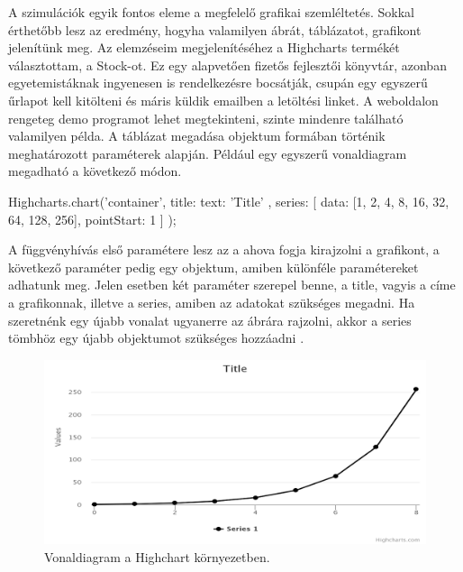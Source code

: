 A szimulációk egyik fontos eleme a megfelelő grafikai szemléltetés. Sokkal érthetőbb lesz az eredmény, hogyha valamilyen ábrát, táblázatot, grafikont jelenítünk meg. Az elemzéseim megjelenítéséhez a Highcharts termékét választottam, a Stock-ot. Ez egy alapvetően fizetős fejlesztői könyvtár, azonban egyetemistáknak ingyenesen is rendelkezésre bocsátják, csupán egy egyszerű űrlapot kell kitölteni és máris küldik emailben a letöltési linket. A weboldalon rengeteg demo programot lehet megtekinteni, szinte mindenre található valamilyen példa. A táblázat megadása objektum formában történik meghatározott paraméterek alapján. Például egy egyszerű vonaldiagram megadható a következő módon.
\begin{javascript}
Highcharts.chart('container', {
    title: {
        text: 'Title'
    },
    series: [{
        data: [1, 2, 4, 8, 16, 32, 64, 128, 256],
        pointStart: 1
    }]
});
\end{javascript}
A függvényhívás első paramétere lesz az a  ahova fogja kirajzolni a grafikont, a következő paraméter pedig egy objektum, amiben különféle paramétereket adhatunk meg. Jelen esetben két paraméter szerepel benne, a title, vagyis a címe a grafikonnak, illetve a series, amiben az adatokat szükséges megadni. Ha szeretnénk egy újabb vonalat ugyanerre az ábrára rajzolni, akkor a series tömbhöz egy újabb objektumot szükséges hozzáadni \cite{Highcharts}.
\begin{figure}[ht]
\centering
\includegraphics[scale=0.35]{images/highchart.png}
\caption{Vonaldiagram a Highchart környezetben.}
\label{fig:highchart}
\end{figure}


